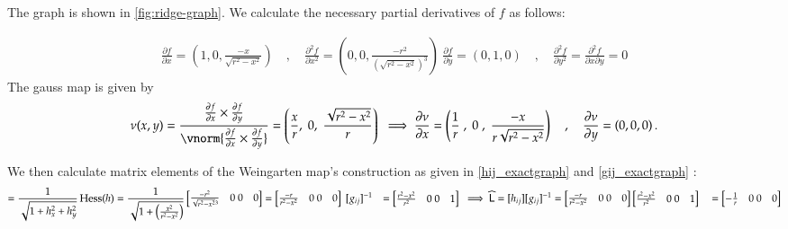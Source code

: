   
  The graph is shown in \cref{fig:ridge-graph}. We calculate the necessary partial derivatives of $f$ as follows:
  
  \begin{gather}
  \frac{\partial f}{\partial x} = \left(1, 0, \frac{-x}{\sqrt{r^2 - x^2}}\right)
  \quad , \quad
  \frac{\partial^2 f}{\partial x^2} = \left(0, 0, \frac{-r^2}{\left(\sqrt{r^2 - x^2}\right)^3}\right) \
  \frac{\partial f}{\partial y} = \left(0, 1, 0\right)
  \quad , \quad
  \frac{\partial^2 f}{\partial y^2} = \frac{\partial^2 f}{\partial x \partial y} = 0
  \end{gather}
  The gauss map is given by
  \begin{gather}
  \nu(x,y) = \frac{\frac{\partial f}{\partial x} \times \frac{\partial f}{\partial y}}
  {\vnorm{\frac{\partial f}{\partial x} \times \frac{\partial f}{\partial y}}}
  = \left( \frac{x}{r} ,\; 0 ,\; \frac{\sqrt{r^2 - x^2}}{r} \right) \
\implies
\frac{\partial \nu}{\partial x}
 = \left(\frac{1}{r} \;,\; 0\;,\; \frac{-x}{r\sqrt{r^2-x^2}}\right)
 \quad , \quad \frac{\partial \nu}{\partial y} = \left(0,0,0\right).
  \end{gather}
  
  We then calculate matrix elements of the Weingarten map's construction as given in
  \cref{hij_exactgraph} and \cref{gij_exactgraph} :
  \begin{align}
  [h_{ij}] = \frac{1}{\sqrt{1+h_x^2 + h_y^2}} \,  \Hess (h)
     &= \frac{1}{\sqrt{1+\left(\frac{x^2}{r^2-x^2}\right)}}
     \begin{bmatrix}
     \frac{-r^2}{\sqrt{r^2 - x^2}^3} & 0 \
    0 & 0
     \end{bmatrix} 
     = \begin{bmatrix}
     \frac{-r}{r^2 - x^2} & 0 \
     0 & 0
     \end{bmatrix} \
     [g_{ij}]^{-1} &= \begin{bmatrix} \frac{r^2 - x^2}{r^2} & 0 \ 0 & 1 \end{bmatrix} \
     \implies \weinmat = [h_{ij}]	[g_{ij}]^{-1} &=
     \begin{bmatrix}
     \frac{-r}{r^2 - x^2} & 0 \
     0 & 0
     \end{bmatrix} \begin{bmatrix} \frac{r^2 - x^2}{r^2} & 0 \ 0 & 1 \end{bmatrix} \
     &= \begin{bmatrix} - \frac{1}{r} & 0 \ 0 & 0 	\end{bmatrix}	       	
  \end{align}
  
